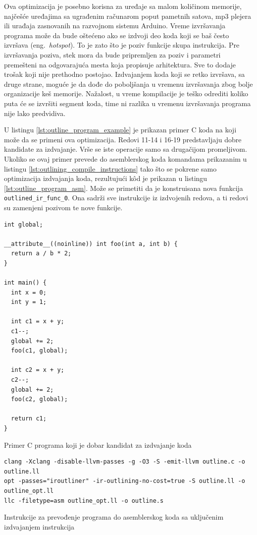 \documentclass[12pt,oneside]{memoir}
\begin{document}
Ova optimizacija je posebno korisna za uređaje sa malom količinom memorije, najčešće uređajima sa ugrađenim računarom poput pametnih satova, mp3 plejera ili urađaja zasnovanih na razvojnom sistemu Arduino.
Vreme izvršavanja programa može da bude oštećeno ako se izdvoji deo koda koji se baš često izvršava (eng.~{\em hotspot}).
To je zato što je poziv funkcije skupa instrukcija.
Pre izvršavanja poziva, stek mora da bude pripremljen za poziv i parametri premešteni na odgovarajuća mesta koja propisuje arhitektura.
Sve to dodaje trošak koji nije prethodno postojao.
Izdvajanjem koda koji se retko izvršava, sa druge strane, moguće je da dođe do poboljšanja u vremenu izvršavanja zbog bolje organizacije keš memorije.
Nažalost, u vreme kompilacije je teško odrediti koliko puta će se izvršiti segment koda, time ni razlika u vremenu izvršavanja programa nije lako predvidiva.

U listingu \ref{lst:outline_program_example} je prikazan primer C koda na koji može da se primeni ova optimizacija.
Redovi 11-14 i 16-19 predstavljaju dobre kandidate za izdvajanje. Vrše se iste operacije samo sa drugačijom promeljivom.
Ukoliko se ovaj primer prevede do asemblerskog koda komandama prikazanim u listingu \ref{lst:outlining_compile_instructions} tako što se pokrene samo optimizacija izdvajanja koda, rezultujući k\^od je prikazan u listingu \ref{lst:outline_program_asm}.
Može se primetiti da je konstruisana nova funkcija \verb|outlined_ir_func_0|. Ona sadrži sve instrukcije iz izdvojenih redova, a ti redovi su zamenjeni pozivom te nove funkcije.

\begin{listing}[!ht]
\begin{verbatim}
int global;

__attribute__((noinline)) int foo(int a, int b) {
  return a / b * 2;
}

int main() {
  int x = 0;
  int y = 1;
  
  int c1 = x + y;
  c1--;
  global += 2;
  foo(c1, global);
  
  int c2 = x + y;
  c2--;
  global += 2;
  foo(c2, global);
  
  return c1;
}
\end{verbatim}
\caption{Primer C programa koji je dobar kandidat za izdvajanje koda}
\label{lst:outline_program_example}
\end{listing}

\begin{listing}[!ht]
  \begin{verbatim}
clang -Xclang -disable-llvm-passes -g -O3 -S -emit-llvm outline.c -o outline.ll
opt -passes="iroutliner" -ir-outlining-no-cost=true -S outline.ll -o outline_opt.ll
llc -filetype=asm outline_opt.ll -o outline.s
  \end{verbatim}
  \caption{Instrukcije za prevođenje programa do asemblerskog koda sa uključenim izdvajanjem instrukcija}
  \label{lst:outlining_compile_instructions}
\end{listing}
\end{document}
